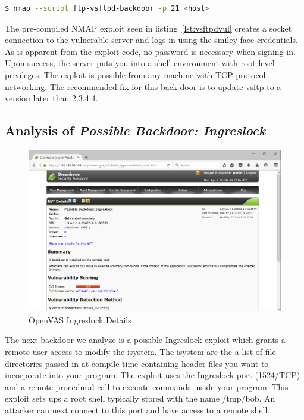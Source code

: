 \documentclass[12pt]{article}
\begin{document}
\begin{lstlisting}[language=bash]
    $ nmap --script ftp-vsftpd-backdoor -p 21 <host>
\end{lstlisting}

The pre-compiled NMAP exploit seen in listing~\ref{lst:vsftpdvul} creates 
a socket connection to the vulnerable server and logs in using the smiley 
face credentials. As is apparent from the exploit code, no password is 
necessary when signing in. Upon success, the server puts you into a shell
environment with root level privileges. The exploit is possible from
any machine with TCP protocol networking. The recommended fix for this
back-door is to update vsftp to a version later than 2.3.4.4.

\subsection{Analysis of \textit{Possible Backdoor: Ingreslock}}
\label{sec:vul2}

\begin{figure}[H]
    \centering
    \includegraphics[width=5.5in]{images/20160403-ingerslock.PNG}
    \caption{OpenVAS Ingreslock Details}
    \label{fig:ingres}
\end{figure}

The next backdoor we analyze is a possible Ingreslock exploit which
grants a remote user access to modify the isystem. The isystem are the a 
list of file directories passed in at compile time containing header files 
you want to incorporate into your program. The exploit uses the Ingreslock 
port (1524/TCP) and a remote procedural call to execute commands inside 
your program. This exploit sets ups a root shell typically stored with the
name /tmp/bob. An attacker can next connect to this port and have access to 
a remote shell.
\end{document}
